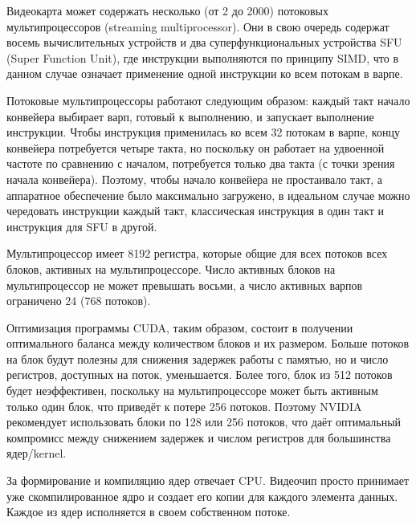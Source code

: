 \documentclass[a4paper,14pt,russian]{extreport}
\begin{document}
\par
Видеокарта может содержать несколько (от 2 до 2000) потоковых мультипроцессоров (streaming multiprocessor). Они в свою очередь содержат восемь вычислительных устройств и два суперфункциональных устройства SFU (Super Function Unit), где инструкции выполняются по принципу SIMD, что в данном случае означает применение одной инструкции ко всем потокам в варпе.
\par 
Потоковые мультипроцессоры работают следующим образом: каждый такт начало конвейера выбирает варп, готовый к выполнению, и запускает выполнение инструкции. Чтобы инструкция применилась ко всем 32 потокам в варпе, концу конвейера потребуется четыре такта, но поскольку он работает на удвоенной частоте по сравнению с началом, потребуется только два такта (с точки зрения начала конвейера). Поэтому, чтобы начало конвейера не простаивало такт, а аппаратное обеспечение было максимально загружено, в идеальном случае можно чередовать инструкции каждый такт, классическая инструкция в один такт и инструкция для SFU в другой.
\par 
Мультипроцессор имеет 8192 регистра, которые общие для всех потоков всех блоков, активных на мультипроцессоре. Число активных блоков на мультипроцессор не может превышать восьми, а число активных варпов ограничено 24 (768 потоков).
\par 
Оптимизация программы CUDA, таким образом, состоит в получении оптимального баланса между количеством блоков и их размером. Больше потоков на блок будут полезны для снижения задержек работы с памятью, но и число регистров, доступных на поток, уменьшается. Более того, блок из 512 потоков будет неэффективен, поскольку на мультипроцессоре может быть активным только один блок, что приведёт к потере 256 потоков. Поэтому NVIDIA рекомендует использовать блоки по 128 или 256 потоков, что даёт оптимальный компромисс между снижением задержек и числом регистров для большинства ядер/kernel.
\par 
За формирование и компиляцию ядер отвечает CPU. Видеочип просто
принимает уже скомпилированное ядро и создает его копии для каждого
элемента данных. Каждое из ядер исполняется в своем собственном потоке.
\end{document}
